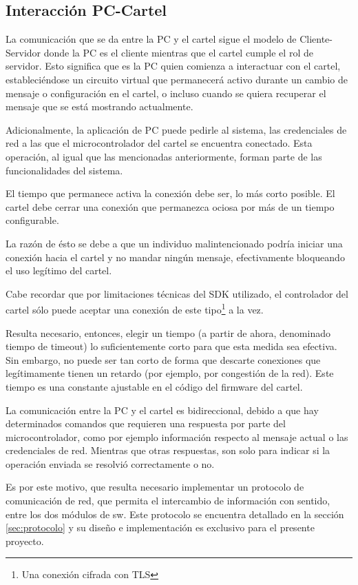 \subsection{Interacción PC-Cartel}
La comunicación que se da entre la PC y el cartel sigue el modelo de Cliente-Servidor donde la PC es el cliente mientras que el cartel cumple el rol de servidor. Esto significa que es la PC quien comienza a interactuar con el cartel, estableciéndose un circuito virtual que permanecerá activo durante un cambio de mensaje o configuración en el cartel, o incluso cuando se quiera recuperar el mensaje que se está mostrando actualmente.

Adicionalmente, la aplicación de PC puede pedirle al sistema, las credenciales de red a las que el microcontrolador del cartel se encuentra conectado. Esta operación, al igual que las mencionadas anteriormente, forman parte de las funcionalidades del sistema.

El tiempo que permanece activa la conexión debe ser, lo más corto posible. El cartel debe cerrar una conexión que permanezca ociosa por más de un tiempo configurable.

La razón de ésto se debe a que un individuo malintencionado podría iniciar una conexión hacia el cartel y no mandar ningún mensaje, efectivamente bloqueando el uso legítimo del cartel.

Cabe recordar que por limitaciones técnicas del SDK utilizado, el controlador del cartel sólo puede aceptar una conexión de este tipo\footnote{Una conexión cifrada con TLS} a la vez. 

Resulta necesario, entonces, elegir un tiempo (a partir de ahora, denominado tiempo de timeout) lo suficientemente corto para que esta medida sea efectiva. Sin embargo, no puede ser tan corto de forma que descarte conexiones que legítimamente tienen un retardo (por ejemplo, por congestión de la red).  Este tiempo es una constante ajustable en el código del firmware del cartel.

La comunicación entre la PC y el cartel es bidireccional, debido a que hay determinados comandos que requieren una respuesta por parte del microcontrolador, como por ejemplo información respecto al mensaje actual o las credenciales de red.
Mientras que otras respuestas, son solo para indicar si la operación enviada se resolvió correctamente o no.

Es por este motivo, que resulta necesario implementar un protocolo de comunicación de red, que permita el intercambio de información con sentido, entre los dos módulos de sw.
Este protocolo se encuentra detallado en la sección \ref{sec:protocolo} y su diseño e implementación es exclusivo para el presente proyecto.

